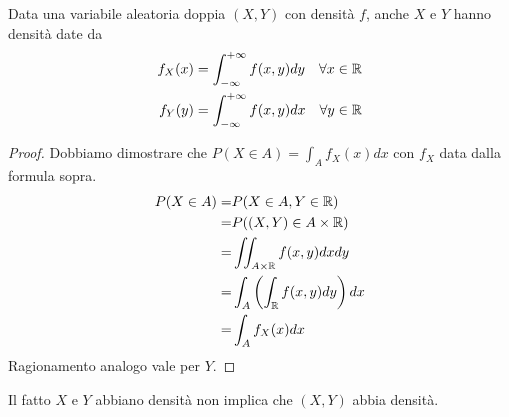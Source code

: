 \begin{proposition}
	Data una variabile aleatoria doppia $(X, Y)$ con densità $f$, anche $X$ e $Y$ hanno densità
	date da
	\begin{align*}
		f_X(x) = \int_{-\infty}^{+\infty} f(x,y) dy \quad \forall x \in \mathbb{R} \\
		f_Y(y) = \int_{-\infty}^{+\infty} f(x,y) dx \quad \forall y \in \mathbb{R}
	\end{align*}
	\begin{proof}
		Dobbiamo dimostrare che $P(X \in A) = \displaystyle\int_A f_X(x) dx$ con $f_X$ data dalla
		formula sopra.
		\begin{align*}
			P(X \in A) = & P(X \in A, Y \in \mathbb{R})                       \\
			=            & P((X, Y) \in A \times \mathbb{R})                  \\
			=            & \iint_{A \times \mathbb{R}} f(x,y) dx dy           \\
			=            & \int_A \left( \int_{\mathbb{R}} f(x,y) dy \right) dx \\
			=            & \int_A f_X (x) dx
		\end{align*}
		Ragionamento analogo vale per $Y$.
	\end{proof}
\end{proposition}

\begin{observation}
	Il fatto $X$ e $Y$ abbiano densità non implica che $(X,Y)$ abbia densità.
\end{observation}
